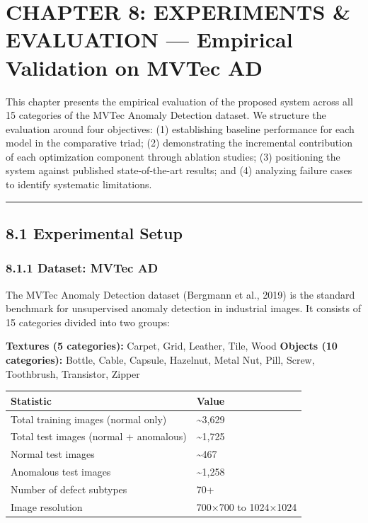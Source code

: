 \section{CHAPTER 8: EXPERIMENTS \& EVALUATION --- Empirical Validation on MVTec AD}\label{chapter-8-experiments-evaluation-empirical-validation-on-mvtec-ad}

This chapter presents the empirical evaluation of the proposed system across all 15 categories of the MVTec Anomaly Detection dataset. We structure the evaluation around four objectives: (1) establishing baseline performance for each model in the comparative triad; (2) demonstrating the incremental contribution of each optimization component through ablation studies; (3) positioning the system against published state-of-the-art results; and (4) analyzing failure cases to identify systematic limitations.

\begin{center}\rule{0.5\linewidth}{0.5pt}\end{center}

\subsection{8.1 Experimental Setup}\label{experimental-setup}

\subsubsection{8.1.1 Dataset: MVTec AD}\label{dataset-mvtec-ad}

The MVTec Anomaly Detection dataset (Bergmann et al., 2019) is the standard benchmark for unsupervised anomaly detection in industrial images. It consists of 15 categories divided into two groups:

\textbf{Textures (5 categories):} Carpet, Grid, Leather, Tile, Wood \textbf{Objects (10 categories):} Bottle, Cable, Capsule, Hazelnut, Metal Nut, Pill, Screw, Toothbrush, Transistor, Zipper

\begin{longtable}[]{@{}ll@{}}
\toprule\noalign{}
Statistic & Value \\
\midrule\noalign{}
\endhead
\bottomrule\noalign{}
\endlastfoot
Total training images (normal only) & \textasciitilde3,629 \\
Total test images (normal + anomalous) & \textasciitilde1,725 \\
Normal test images & \textasciitilde467 \\
Anomalous test images & \textasciitilde1,258 \\
Number of defect subtypes & 70+ \\
Image resolution & 700×700 to 1024×1024 \\
\end{longtable}

